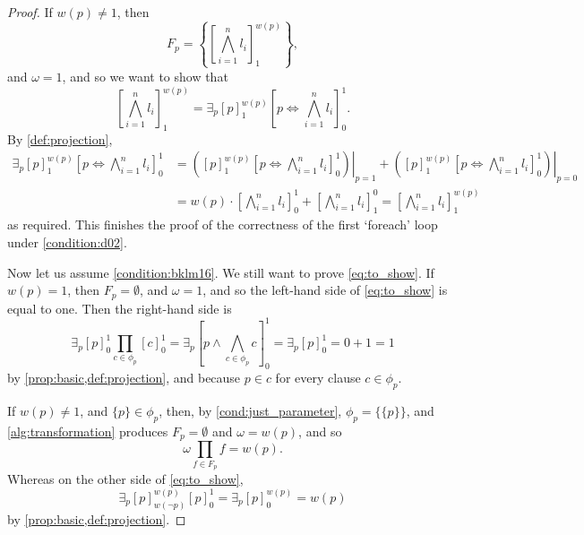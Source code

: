 \documentclass{article}
\theoremstyle{definition}
\theoremstyle{remark}
\begin{document}
\begin{proof}
  If $w(p) \ne 1$, then
  \[
    F_p = \left\{ \left[ \bigwedge_{i = 1}^n l_i \right]_1^{w(p)} \right\},
  \]
  and $\omega = 1$, and so we want to show that
  \[
    \left[ \bigwedge_{i = 1}^n l_i \right]_1^{w(p)} = \exists_p [p]_1^{w(p)}
    \left[ p \Leftrightarrow \bigwedge_{i=1}^n l_i \right]_0^1.
  \]
  By \cref{def:projection},
  \begin{align*}
    \exists_p [p]_1^{w(p)} \left[ p \Leftrightarrow \bigwedge_{i=1}^n l_i \right]_0^1 &= \left.\left( [p]_1^{w(p)} \left[ p \Leftrightarrow \bigwedge_{i=1}^n l_i \right]_0^1 \right)\right|_{p=1} + \left.\left([p]_1^{w(p)} \left[ p \Leftrightarrow \bigwedge_{i=1}^n l_i \right]_0^1 \right)\right|_{p=0} \\
                                                                                      &= w(p) \cdot \left[ \bigwedge_{i=1}^n l_i \right]_0^1 + \left[ \bigwedge_{i=1}^n l_i \right]_1^0 = \left[ \bigwedge_{i=1}^n l_i \right]_1^{w(p)}
  \end{align*}
  as required. This finishes the proof of the correctness of the first `foreach'
  loop under \cref{condition:d02}.

  Now let us assume \cref{condition:bklm16}. We still want to prove
  \cref{eq:to_show}. If $w(p) = 1$, then $F_p = \emptyset$, and $\omega = 1$,
  and so the left-hand side of \cref{eq:to_show} is equal to one. Then the
  right-hand side is
  \[
    \exists_p [p]_0^1 \prod_{c \in \phi_p} [c]_0^1 = \exists_p \left[ p \land
      \bigwedge_{c \in \phi_p} c \right]_0^1 = \exists_p [p]_0^1 = 0 + 1 = 1
  \]
  by \cref{prop:basic,def:projection}, and because $p \in c$ for every clause $c
  \in \phi_p$.

  If $w(p) \ne 1$, and $\{ p \} \in \phi_p$, then, by
  \cref{cond:just_parameter}, $\phi_p = \{ \{ p \} \}$, and
  \cref{alg:transformation} produces $F_p = \emptyset$ and $\omega = w(p)$, and
  so
  \[
    \omega \prod_{f \in F_p} f = w(p).
  \]
  Whereas on the other side of \cref{eq:to_show},
  \[
    \exists_p [p]_{w(\neg p)}^{w(p)} [p]_0^1 = \exists_p [p]^{w(p)}_0 = w(p)
  \]
  by \cref{prop:basic,def:projection}.


\end{proof}
\end{document}
